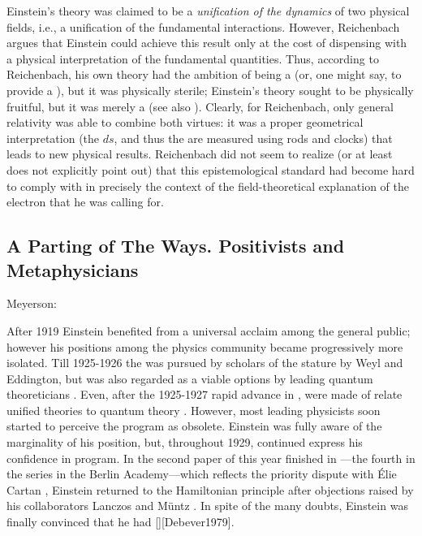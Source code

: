 \documentclass[draft]{article}
\begin{document}
Einstein's theory was claimed to be a \emph{unification of the dynamics} of two physical fields, i.e., a unification of the fundamental interactions. However, Reichenbach argues that Einstein could achieve this result only at the cost of dispensing with a physical interpretation of the fundamental quantities. Thus, according to Reichenbach, his own theory had the ambition of being a  (or, one might say, to provide a ), but it was physically sterile; Einstein's theory sought to be physically fruitful, but it was merely a  (see also \cite{Eddington1929}). Clearly, for Reichenbach, only general relativity was able to combine both virtues: it was a proper geometrical interpretation (the $d s$, and thus the \gmn are measured using rods and clocks) that leads to new physical results. Reichenbach did not seem to realize (or at least does not explicitly point out) that this epistemological standard had become hard to comply with in precisely the context of the field-theoretical explanation of the electron that he was calling for. 

\subsection{A Parting of The Ways. Positivists and Metaphysicians}
\label{positivistsmetaphysicians}

Meyerson:

After 1919 Einstein benefited from a universal acclaim among the general public; however his positions among the physics community became progressively more isolated. Till 1925-1926 the \uftp was pursued by scholars of the stature by Weyl and Eddington, but was also regarded as a viable options by leading quantum theoreticians \citep[209]{Vizgin1994}. Even, after the 1925-1927 rapid advance in \qm, were made of relate unified theories to quantum theory \citep{Klein1926a}. However, most leading physicists  soon started to perceive the program as obsolete. Einstein was fully aware of the marginality of his position, but, throughout 1929, continued express his confidence in \FP program. In the second paper of this year finished in ---the fourth in the series in the Berlin Academy---which reflects the priority dispute with Élie Cartan \citep{Debever1979}, Einstein returned to the Hamiltonian principle after objections raised by his collaborators Lanczos and Müntz \citep{Einstein1930c}.  In spite of the many doubts, Einstein was finally convinced that he had  [][Debever1979].
\end{document}
